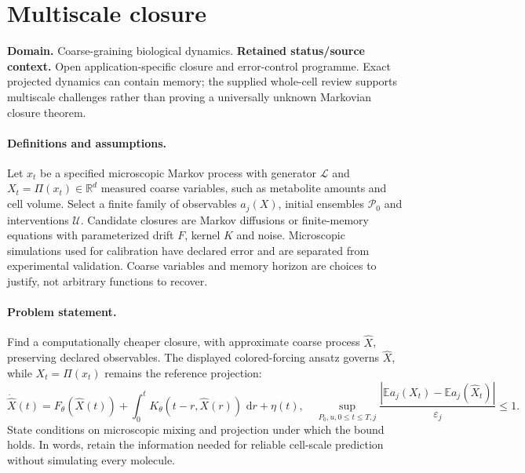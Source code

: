 \documentclass[11pt]{article}
\begin{document}
\section*{Multiscale closure}
\label{prob:042}
\label{rank:23}
\par\smallskip

\noindent\textbf{Domain.} Coarse-graining biological dynamics. \quad \textbf{Retained status/source context.} Open application-specific closure and error-control programme. Exact projected dynamics can contain memory; the supplied whole-cell review supports multiscale challenges rather than proving a universally unknown Markovian closure theorem.
\paragraph{Definitions and assumptions.} Let $x_t$ be a specified microscopic Markov process with generator $\mathcal L$ and $X_t=\Pi(x_t)\in\mathbb{R}^d$ measured coarse variables, such as metabolite amounts and cell volume. Select a finite family of observables $a_j(X)$, initial ensembles $\mathcal P_0$ and interventions $\mathcal U$. Candidate closures are Markov diffusions or finite-memory equations with parameterized drift $F$, kernel $K$ and noise. Microscopic simulations used for calibration have declared error and are separated from experimental validation. Coarse variables and memory horizon are choices to justify, not arbitrary functions to recover.
\paragraph{Problem statement.} Find a computationally cheaper closure, with approximate coarse process $\widehat X$, preserving declared observables. The displayed colored-forcing ansatz governs $\widehat X$, while $X_t=\Pi(x_t)$ remains the reference projection:
\[
\dot{\widehat X}(t)=F_\theta(\widehat X(t))+\int_0^tK_\theta(t-r,\widehat X(r))\,\,\mathrm{d} r+\eta(t),
\quad\sup_{P_0,u,0\leq t\leq T,j}\frac{|\mathbb{E} a_j(X_t)-\mathbb{E} a_j(\widehat X_t)|}{\varepsilon_j}\leq1.
\]
State conditions on microscopic mixing and projection under which the bound holds. In words, retain the information needed for reliable cell-scale prediction without simulating every molecule.
\end{document}
